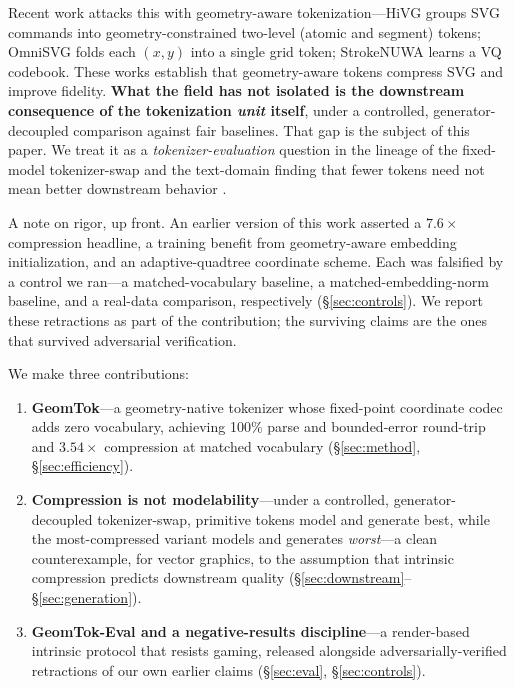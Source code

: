 \documentclass[11pt]{article}
\begin{document}
Recent work attacks this with geometry-aware tokenization---HiVG \citep{hivg2026} groups SVG commands into geometry-constrained two-level (atomic and segment) tokens; OmniSVG \citep{omnisvg2025} folds each \((x,y)\) into a single grid token; StrokeNUWA \citep{strokenuwa2024} learns a VQ codebook. These works establish that geometry-aware tokens compress SVG and improve fidelity. \textbf{What the field has not isolated is the downstream consequence of the tokenization \emph{unit} itself}, under a controlled, generator-decoupled comparison against fair baselines. That gap is the subject of this paper. We treat it as a \emph{tokenizer-evaluation} question in the lineage of the fixed-model tokenizer-swap \citep{ali2024tokenizer,lotz2025} and the text-domain finding that fewer tokens need not mean better downstream behavior \citep{schmidt2024pathpiece}.

A note on rigor, up front. An earlier version of this work asserted a $7.6\times$ compression headline, a training benefit from geometry-aware embedding initialization, and an adaptive-quadtree coordinate scheme. Each was falsified by a control we ran---a matched-vocabulary baseline, a matched-embedding-norm baseline, and a real-data comparison, respectively (\S\ref{sec:controls}). We report these retractions as part of the contribution; the surviving claims are the ones that survived adversarial verification.

We make three contributions:
\begin{enumerate}
\item \textbf{GeomTok}---a geometry-native tokenizer whose fixed-point coordinate codec adds zero vocabulary, achieving 100\% parse and bounded-error round-trip and $3.54\times$ compression at matched vocabulary (\S\ref{sec:method}, \S\ref{sec:efficiency}).
\item \textbf{Compression is not modelability}---under a controlled, generator-decoupled tokenizer-swap, primitive tokens model and generate best, while the most-compressed variant models and generates \emph{worst}---a clean counterexample, for vector graphics, to the assumption that intrinsic compression predicts downstream quality (\S\ref{sec:downstream}--\S\ref{sec:generation}).
\item \textbf{GeomTok-Eval and a negative-results discipline}---a render-based intrinsic protocol that resists gaming, released alongside adversarially-verified retractions of our own earlier claims (\S\ref{sec:eval}, \S\ref{sec:controls}).
\end{enumerate}
\end{document}
